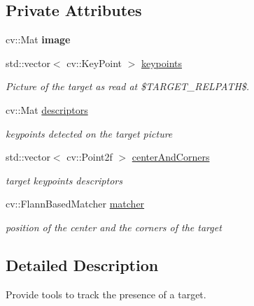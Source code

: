\subsection*{Private Attributes}
\begin{DoxyCompactItemize}
\item 
\mbox{\label{classTarget_ae6fef05f06361399105661363eda1b48}} 
cv\+::\+Mat {\bfseries image}
\item 
\mbox{\label{classTarget_a832b225c80fbe2a9015b875810d3d58d}} 
std\+::vector$<$ cv\+::\+Key\+Point $>$ \hyperlink{classTarget_a832b225c80fbe2a9015b875810d3d58d}{keypoints}
\begin{DoxyCompactList}\small\item\em Picture of the target as read at \$\+T\+A\+R\+G\+E\+T\+\_\+\+R\+E\+L\+P\+A\+TH\$. \end{DoxyCompactList}\item 
\mbox{\label{classTarget_a8ff89fafe1f7733950775eddbcd24abd}} 
cv\+::\+Mat \hyperlink{classTarget_a8ff89fafe1f7733950775eddbcd24abd}{descriptors}
\begin{DoxyCompactList}\small\item\em keypoints detected on the target picture \end{DoxyCompactList}\item 
\mbox{\label{classTarget_a05b3598fe7077a631c8c1b8accb60dea}} 
std\+::vector$<$ cv\+::\+Point2f $>$ \hyperlink{classTarget_a05b3598fe7077a631c8c1b8accb60dea}{center\+And\+Corners}
\begin{DoxyCompactList}\small\item\em target keypoints descriptors \end{DoxyCompactList}\item 
\mbox{\label{classTarget_a0f2a301f380d5ef780b246c44ea3a132}} 
cv\+::\+Flann\+Based\+Matcher \hyperlink{classTarget_a0f2a301f380d5ef780b246c44ea3a132}{matcher}
\begin{DoxyCompactList}\small\item\em position of the center and the corners of the target \end{DoxyCompactList}\end{DoxyCompactItemize}


\subsection{Detailed Description}
Provide tools to track the presence of a target. 

